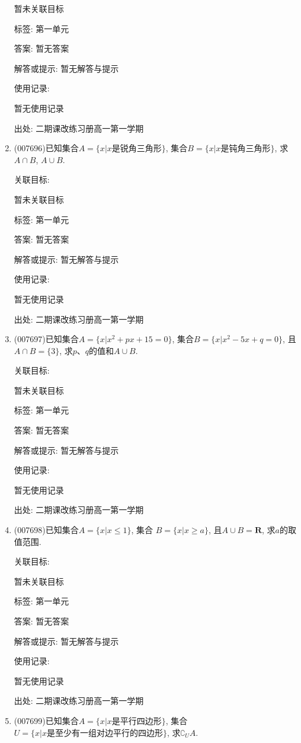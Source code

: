 \documentclass[10pt,a4paper]{article}
\begin{document}
\begin{enumerate}[1.]
暂未关联目标



标签: 第一单元

答案: 暂无答案

解答或提示: 暂无解答与提示

使用记录:

暂无使用记录


出处: 二期课改练习册高一第一学期
\item { (007696)}已知集合$A=\{x|x\text{是锐角三角形}\}$, 集合$B=\{x|x\text{是钝角三角形}\}$, 求$A\cap B$, $A\cup B$.


关联目标:

暂未关联目标



标签: 第一单元

答案: 暂无答案

解答或提示: 暂无解答与提示

使用记录:

暂无使用记录


出处: 二期课改练习册高一第一学期
\item { (007697)}已知集合$A=\{x|x^2+px+15=0\}$, 集合$B=\{x|x^2-5x+q=0\}$, 且$A\cap B=\{3\}$, 求$p$、$q$的值和$A\cup B$.


关联目标:

暂未关联目标



标签: 第一单元

答案: 暂无答案

解答或提示: 暂无解答与提示

使用记录:

暂无使用记录


出处: 二期课改练习册高一第一学期
\item { (007698)}已知集合$A=\{x|x\le 1\}$, 集合 $B=\{x|x\ge a\}$, 且$A\cup B=\mathbf{R}$, 求$a$的取值范围.


关联目标:

暂未关联目标



标签: 第一单元

答案: 暂无答案

解答或提示: 暂无解答与提示

使用记录:

暂无使用记录


出处: 二期课改练习册高一第一学期
\item { (007699)}已知集合$A=\{x|x\text{是平行四边形}\}$, 集合$U=\{x|x\text{是至少有一组对边平行的四边形}\}$, 求$\complement _UA$.



\end{enumerate}
\end{document}
